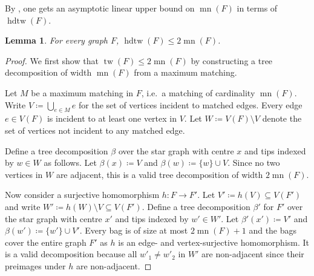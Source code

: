 \documentclass[10pt,a4paper]{article}
\theoremstyle{definition}
\theoremstyle{plain}
\newtheorem{lemma}[definition]{Lemma}
\theoremstyle{remark}
\DeclareMathOperator{\tw}{tw}
\DeclareMathOperator{\hdtw}{hdtw}
\DeclareMathOperator{\mn}{mn}
\begin{document}
	By \cite[220]{curticapean_homomorphisms_2017}, one gets an asymptotic linear upper bound on $\mn(F)$ in terms of $\hdtw(F)$.
	
	\begin{lemma}
		For every graph $F$,
		$\hdtw(F) \leq 2\mn(F)$.
	\end{lemma}
	\begin{proof}
		We first show that $\tw(F) \leq 2\mn(F)$ by constructing a tree decomposition of width $\mn(F)$ from a maximum matching.
		
		Let $M$ be a maximum matching in $F$, i.e.\ a matching of cardinality $\mn(F)$.
		Write $V \coloneqq \bigcup_{e \in M} e$ for the set of vertices incident to matched edges.
		Every edge $e \in V(F)$ is incident to at least one vertex in $V$.
		Let $W \coloneqq V(F) \setminus V$ denote the set of vertices not incident to any matched edge.
		
		Define a tree decomposition $\beta$ over the star graph with centre $x$ and tips indexed by $w \in W$ as follows.
		Let $\beta(x) \coloneqq V$ and $\beta(w) \coloneqq \{w\} \cup V$.
		Since no two vertices in $W$ are adjacent, this is a valid tree decomposition of width $2 \mn(F)$.
		
		Now consider a surjective homomorphism $h \colon F \to F'$.
		Let $V' \coloneqq h(V) \subseteq V(F')$ and write $W' \coloneqq h(W) \setminus V \subseteq V(F')$.
		Define a tree decomposition $\beta'$ for $F'$ over the star graph with centre $x'$ and tips indexed by $w' \in W'$.
		Let $\beta'(x') \coloneqq V'$ and $\beta(w') \coloneqq \{w'\} \cup V'$.
		Every bag is of size at most $2\mn(F) + 1$ and the bags cover the entire graph $F'$ as $h$ is an edge- and vertex-surjective homomorphism.
		It is a valid decomposition because all $w'_1 \neq w'_2$ in $W'$ are non-adjacent since their preimages under $h$ are non-adjacent.
	\end{proof}
	
	
\end{document}
